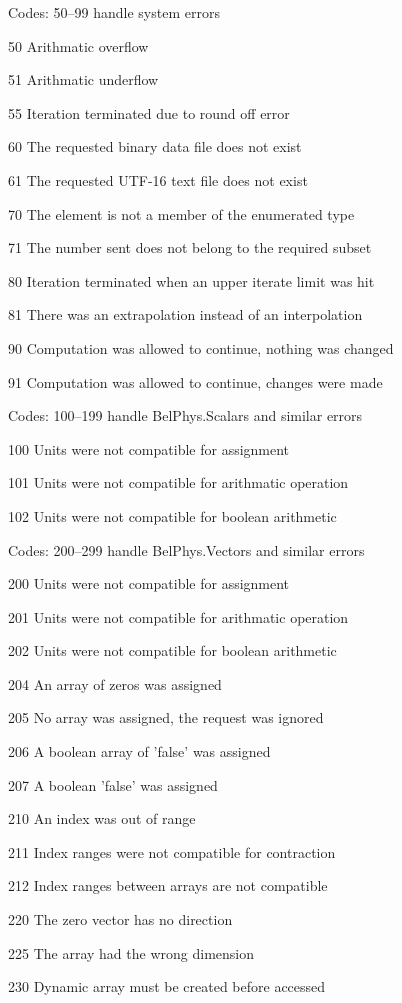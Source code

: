 \documentclass[twocolumn,twoside,fleqn,12pt]{article}
\newcommand{\namelistlabel}[1]{\mbox{#1}\hfil}
\newenvironment{namelist}[1]
   {\begin{list}{}%
      {\let\makelabel\namelistlabel%
       \settowidth{\labelwidth}{#1}%
       \setlength{\leftmargin}{1.1\labelwidth}%
       \setlength{\itemsep}{-6pt}%
      }%
   }{\end{list}%
}
\begin{document}
Codes: 50--99  handle system errors
\begin{namelist}{9999}
   \item[50]  Arithmatic overflow
   \item[51]  Arithmatic underflow
   \item[55]  Iteration terminated due to round off error
   \item[60]  The requested binary data file does not exist
   \item[61]  The requested UTF-16 text file does not exist
   \item[70]  The element is not a member of the enumerated type
   \item[71]  The number sent does not belong to the required subset
   \item[80]  Iteration terminated when an upper iterate limit was hit
   \item[81]  There was an extrapolation instead of an interpolation
   \item[90]  Computation was allowed to continue, nothing was changed
   \item[91]  Computation was allowed to continue, changes were made
\end{namelist}

Codes: 100--199  handle BelPhys.Scalars and similar errors
\begin{namelist}{9999}
   \item[100] Units were not compatible for assignment
   \item[101] Units were not compatible for arithmatic operation
   \item[102] Units were not compatible for boolean arithmetic
\end{namelist}

Codes: 200--299  handle BelPhys.Vectors and similar errors
\begin{namelist}{9999}
   \item[200] Units were not compatible for assignment
   \item[201] Units were not compatible for arithmatic operation
   \item[202] Units were not compatible for boolean arithmetic
   \item[204] An array of zeros was assigned
   \item[205] No array was assigned, the request was ignored
   \item[206] A boolean array of 'false' was assigned
   \item[207] A boolean 'false' was assigned
   \item[210] An index was out of range
   \item[211] Index ranges were not compatible for contraction
   \item[212] Index ranges between arrays are not compatible
   \item[220] The zero vector has no direction
   \item[225] The array had the wrong dimension
   \item[230] Dynamic array must be created before accessed
\end{namelist}
\end{document}
